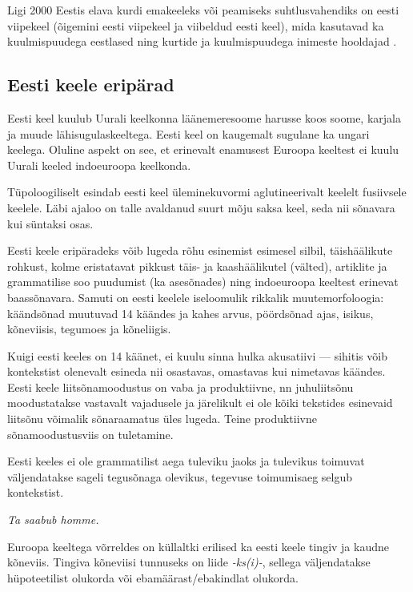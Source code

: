 \begin{multicols}{2}
Ligi 2000 Eestis elava kurdi emakeeleks või peamiseks suhtlusvahendiks on eesti viipekeel (õigemini eesti viipekeel ja viibeldud eesti keel), mida kasutavad ka kuulmispuudega eestlased ning kurtide ja kuulmispuudega inimeste hooldajad \cite{Sign}. 

\subsection{Eesti keele eripärad}

Eesti keel kuulub Uurali keelkonna läänemeresoome harusse koos soome, karjala ja muude lähisugulaskeeltega. 
Eesti keel on kaugemalt sugulane ka ungari keelega. 
Oluline aspekt on see, et erinevalt enamusest Euroopa keeltest ei kuulu Uurali keeled indoeuroopa keelkonda.

Tüpoloogiliselt esindab eesti keel üle\-minekuvormi aglutineerivalt keelelt fusiiv\-sele keelele. 
Läbi ajaloo on talle avaldanud suurt mõju saksa keel, seda nii sõnavara kui süntaksi osas.

Eesti keele eripäradeks võib lugeda rõhu esinemist esimesel silbil,  täishäälikute rohkust, kolme eristatavat pikkust täis- ja kaashäälikutel (välted), artiklite ja grammatilise soo puudumist (ka asesõnades) ning indoeuroopa keeltest erinevat baassõnavara. 
Samuti on eesti keelele iseloomulik rikkalik muutemorfoloogia: käändsõnad muutuvad 14 käändes ja kahes arvus, pöördsõnad ajas, isikus, kõneviisis, tegumoes ja kõneliigis. 

Kuigi eesti keeles on 14 käänet, ei kuulu sinna hulka akusatiivi --- sihitis võib kontekstist olenevalt esineda nii osastavas, omastavas kui nimetavas käändes.
Eesti keele liitsõnamoodustus on vaba ja produktiivne, nn juhuliitsõnu moodustatakse vastavalt vajadusele ja järelikult ei ole kõiki tekstides esinevaid liitsõnu võimalik sõnaraamatus üles lugeda.
Teine produktiivne sõnamoodustusviis on tuletamine.


Eesti keeles ei ole grammatilist aega tuleviku jaoks ja tulevikus toimuvat väljendatakse sageli tegusõnaga olevikus, tegevuse toimumisaeg selgub kontekstist.

\textit{Ta saabub homme. }

Euroopa keeltega võrreldes on küllaltki erilised ka eesti keele tingiv ja kaudne kõneviis. 
Tingiva kõneviisi tunnuseks on liide \textit{-ks(i)-}, sellega väljendatakse hüpoteetilist olukorda või ebamäärast/ebakind\-lat olukorda.


\end{multicols}
